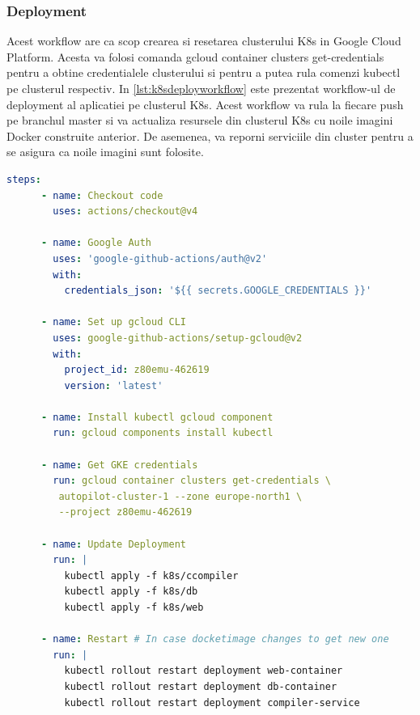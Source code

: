 \documentclass[titlepage,12pt]{article}
\DeclareRobustCommand{\code}[1]{{\ttfamily\small #1}}
\begin{document}
\subsubsection{Deployment}
Acest workflow are ca scop crearea si resetarea clusterului \ac {K8s} in Google Cloud Platform. Acesta va folosi comanda \code{gcloud container clusters get-credentials} pentru a obtine credentialele clusterului si pentru a putea rula comenzi \code{kubectl} pe clusterul respectiv. In \cref{lst:k8sdeployworkflow} este prezentat workflow-ul de deployment al aplicatiei pe clusterul \ac {K8s}. Acest workflow va rula la fiecare push pe branchul \code{master} si va actualiza resursele din clusterul \ac {K8s} cu noile imagini Docker construite anterior. De asemenea, va reporni serviciile din cluster pentru a se asigura ca noile imagini sunt folosite.

\begin{lstlisting}[language=yaml,caption={Workflow deployment K8s},label={lst:k8sdeployworkflow}]
    steps:
      - name: Checkout code
        uses: actions/checkout@v4

      - name: Google Auth
        uses: 'google-github-actions/auth@v2'
        with:
          credentials_json: '${{ secrets.GOOGLE_CREDENTIALS }}'

      - name: Set up gcloud CLI
        uses: google-github-actions/setup-gcloud@v2
        with:
          project_id: z80emu-462619
          version: 'latest'

      - name: Install kubectl gcloud component
        run: gcloud components install kubectl

      - name: Get GKE credentials
        run: gcloud container clusters get-credentials \
         autopilot-cluster-1 --zone europe-north1 \
         --project z80emu-462619

      - name: Update Deployment
        run: |
          kubectl apply -f k8s/ccompiler
          kubectl apply -f k8s/db
          kubectl apply -f k8s/web

      - name: Restart # In case docketimage changes to get new one
        run: |
          kubectl rollout restart deployment web-container
          kubectl rollout restart deployment db-container
          kubectl rollout restart deployment compiler-service
\end{lstlisting}
\end{document}
